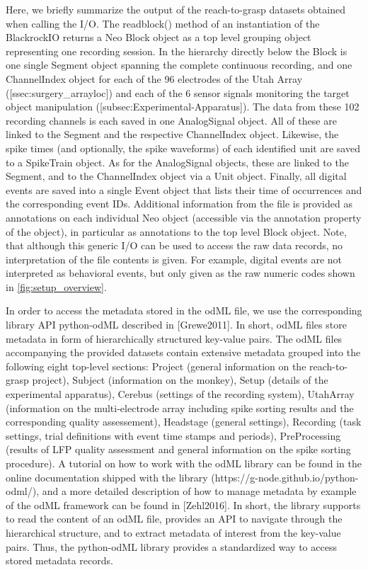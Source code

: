 {Here, we briefly summarize the output of the reach-to-grasp datasets obtained when calling the I/O. The readblock() method of an instantiation of the BlackrockIO returns a Neo Block object as a top level grouping object representing one recording session. In the hierarchy directly below the Block is one single Segment object spanning the complete continuous recording, and one ChannelIndex object for each of the 96 electrodes of the Utah Array ([ssec:surgery\_arrayloc]) and each of the 6 sensor signals monitoring the target object manipulation ([subsec:Experimental-Apparatus]). The data from these 102 recording channels is each saved in one AnalogSignal object. All of these are linked to the Segment and the respective ChannelIndex object. Likewise, the spike times (and optionally, the spike waveforms) of each identified unit are saved to a SpikeTrain object. As for the AnalogSignal objects, these are linked to the Segment, and to the ChannelIndex object via a Unit object. Finally, all digital events are saved into a single Event object that lists their time of occurrences and the corresponding event IDs. Additional information from the file is provided as annotations on each individual Neo object (accessible via the annotation property of the object), in particular as annotations to the top level Block object. Note, that although this generic I/O can be used to access the raw data records, no interpretation of the file contents is given. For example, digital events are not interpreted as behavioral events, but only given as the raw numeric codes shown in \cref{fig:setup_overview}. 

In order to access the metadata stored in the odML file, we use the corresponding library API python-odML described in [Grewe2011]. In short, odML files store metadata in form of hierarchically structured key-value pairs. The odML files accompanying the provided datasets contain extensive metadata grouped into the following eight top-level sections: Project (general information on the reach-to-grasp project), Subject (information on the monkey), Setup (details of the experimental apparatus), Cerebus (settings of the recording system), UtahArray (information on the multi-electrode array including spike sorting results and the corresponding quality assessement), Headstage (general settings), Recording (task settings, trial definitions with event time stamps and periods), PreProcessing (results of LFP quality assessment and general information on the spike sorting procedure). A tutorial on how to work with the odML library can be found in the online documentation shipped with the library (https://g-node.github.io/python-odml/), and a more detailed description of how to manage metadata by example of the odML framework can be found in [Zehl2016]. In short, the library supports to read the content of an odML file, provides an API to navigate through the hierarchical structure, and to extract metadata of interest from the key-value pairs. Thus, the python-odML library provides a standardized way to access stored metadata records. 

}
